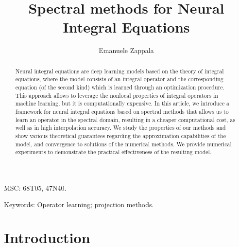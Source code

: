 \documentclass[11pt,fleqn]{amsart} %
\begin{document}
	
	
	\title{Spectral methods for Neural Integral Equations}
	
	\author{Emanuele Zappala} 
	\address{Department of Mathematics and Statistics, Idaho State University\\
		Physical Science Complex |  921 S. 8th Ave., Stop 8085 | Pocatello, ID 83209} 
	
	\maketitle
	
	
	\begin{abstract}
		Neural integral equations are deep learning models based on the theory of integral equations, where the model consists of an integral operator and the corresponding equation (of the second kind) which is learned through an optimization procedure. This approach allows to leverage the nonlocal properties of integral operators in machine learning, but it is computationally expensive. In this article, we introduce a framework for neural integral equations based on spectral methods that allows us to learn an operator in the spectral domain, resulting in a cheaper computational cost, as well as in high interpolation accuracy. We study the properties of our methods and show various theoretical guarantees regarding the approximation capabilities of the model, and convergence to solutions of the numerical methods. We provide numerical experiments to demonstrate the practical effectiveness of the resulting model. 
	\end{abstract}
	
	MSC: 68T05, 47N40.
	
	Keywords: Operator learning; projection methods. 
	
	\date{\empty}
	
	
	
	\tableofcontents
	
	
	\section{Introduction}
	
\end{document}
